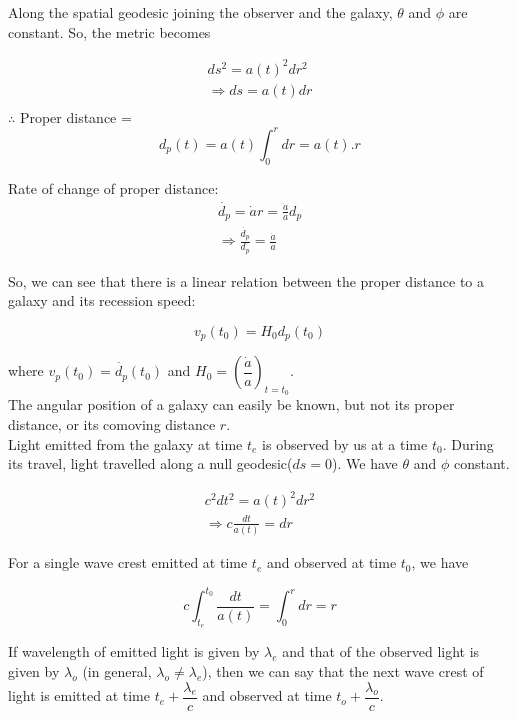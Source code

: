 \documentclass[a4,10pt,oneside]{report}
\begin{document}
	Along the spatial geodesic joining the observer and the galaxy, $ \theta $ and $ \phi $ are constant. So, the metric becomes
	
	\begin{eqnarray}
		ds^2=a(t)^2dr^2 \\
		\Rightarrow ds=a(t)dr \\
	\end{eqnarray}
	$\therefore$ Proper distance =\[d_p(t)=a(t)\int_0^r dr= a(t).r  \]
	
	Rate of change of proper distance:
	\begin{eqnarray}
		\dot{d_p}=\dot{a} r = \frac{\dot{a}}{a}d_p \\
		\Rightarrow \frac{\dot{d_p}}{d_p}=\frac{\dot{a}}{a}
	\end{eqnarray}
	
	So, we can see that there is a linear relation between the proper distance to a galaxy and its recession speed:
	
	\begin{equation}
		v_p(t_0)=H_0d_p(t_0)
	\end{equation}
	
	where $v_p(t_0)=\dot{d_p}(t_0)$ and $ H_0=\left(\dfrac{\dot{a}}{a}\right)_{t=t_0} $. \\
	
	
	The angular position of a galaxy can easily be known, but not its proper distance, or its comoving distance $ r $. \\
	
	Light emitted from the galaxy at time $ t_e $ is observed by us at a time $ t_0 $. During its travel, light travelled along a null geodesic($ ds=0 $). We have $ \theta $ and $ \phi $ constant.
	
	\begin{eqnarray}
		c^2dt^2=a(t)^2dr^2 \\
		\Rightarrow c\frac{dt}{a(t)}=dr
	\end{eqnarray}
	
	For a single wave crest emitted at time $ t_e $ and observed at time $ t_0 $, we have
	
	\begin{equation}
		c\int_{t_e}^{t_0} \frac{dt}{a(t)} = \int_0^r dr = r
	\end{equation}
	
	If wavelength of emitted light is given by $ \lambda_e $ and that of the observed light is given by $ \lambda_o $ (in general, $ \lambda_o \neq \lambda_e $), then we can say that the next wave crest of light is emitted at time $ t_e+\dfrac{\lambda_e}{c} $ and observed at time $ t_o + \dfrac{\lambda_o}{c} $.
	
\end{document}

